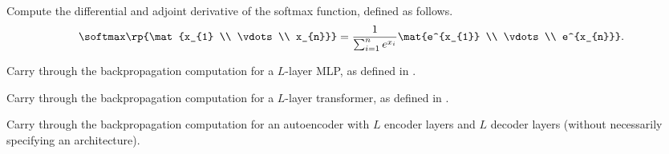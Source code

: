 \documentclass[../../book-main.tex]{subfiles}
\begin{document}
\begin{exercise}
    Compute the differential and adjoint derivative of the softmax
    function, defined as follows.
    \begin{equation}
        \softmax\rp{\mat{x_{1} \\ \vdots \\ x_{n}}} =
        \frac{1}{\sum_{i = 1}^{n}e^{x_{i}}}\mat{e^{x_{1}} \\ \vdots \\ e^{x_{n}}}.
    \end{equation}
\end{exercise}

\begin{exercise}
    Carry through the backpropagation computation for a \(L\)-layer
    MLP, as defined in .
\end{exercise}

\begin{exercise}
    Carry through the backpropagation computation for a \(L\)-layer
    transformer, as defined in .
\end{exercise}

\begin{exercise}
    Carry through the backpropagation computation for an autoencoder
    with \(L\) encoder layers and \(L\) decoder layers (without
    necessarily specifying an architecture).
\end{exercise}
\end{document}
